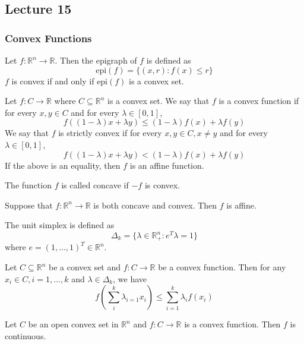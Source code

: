 
\subsection{Lecture 15}
\subsubsection{Convex Functions}
\begin{definition}[Epigraph]
    Let $f: \mathbb R^n \to \mathbb R$. Then the epigraph of $f$ is defined as
    $$\text{epi}(f) = \{(x, r): f(x) \leq r\}$$
    $f$ is convex if and only if $\text{epi}(f)$ is a convex set.
\end{definition}

\begin{definition}
    Let $f: C \to \mathbb R$ where $C \subseteq \mathbb R^n$ is a convex set. We say that $f$ is a convex function if for every $x, y \in C$ and for every $\lambda \in [0,1]$,
    $$f((1 - \lambda)x + \lambda y) \leq (1 - \lambda) f(x) + \lambda f(y)$$
    We say that $f$ is strictly convex if for every $x, y \in C, x \neq y$ and for every $\lambda \in [0,1]$,
    $$f((1 - \lambda)x + \lambda y) < (1 - \lambda) f(x) + \lambda f(y)$$
    If the above is an equality, then $f$ is an affine function.
\end{definition}
\begin{definition}
    The function $f$ is called concave if $-f$ is convex.
\end{definition}
\begin{theorem}
    Suppose that $f: \mathbb R^n \to \mathbb R$ is both concave and convex. Then $f$ is affine.
\end{theorem}
\begin{definition}
    The unit simplex is defined as 
    $$\Delta_k = \{\lambda \in \mathbb R^n_+: e^T\lambda = 1\}$$
    where $e = (1, \ldots, 1)^T \in \mathbb R^n$.
\end{definition}
\begin{theorem}
    Let $C \subseteq \mathbb R^n$ be a convex set and $f: C \to \mathbb R$ be a convex function. Then for any $x_i \in C, i = 1,\ldots,k$ and $\lambda \in \Delta_k$, we have
    $$f\left(\sum_i^k \lambda_{i=1} x_i\right) \leq \sum_{i=1}^k \lambda_i f(x_i)$$
\end{theorem}
\begin{theorem}[]
    Let $C$ be an open convex set in $\mathbb R^n$ and $f: C \to \mathbb R$ is a convex function. Then $f$ is continuous. 
\end{theorem}
